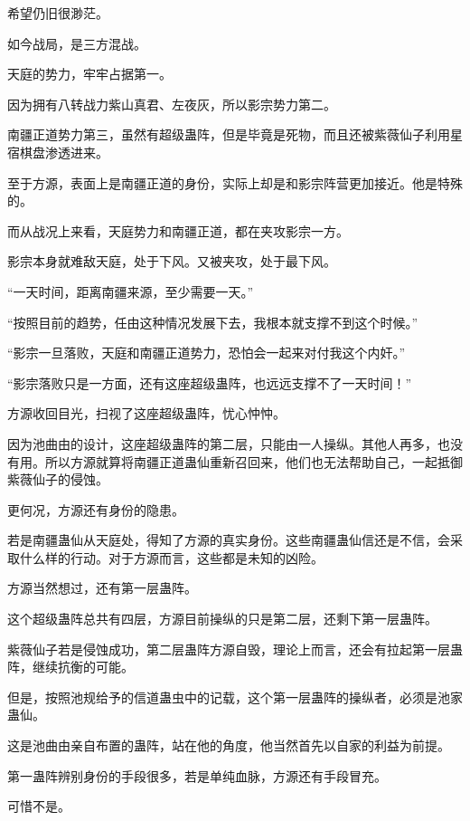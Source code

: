 
\begin{this_body}

希望仍旧很渺茫。

如今战局，是三方混战。

天庭的势力，牢牢占据第一。

因为拥有八转战力紫山真君、左夜灰，所以影宗势力第二。

南疆正道势力第三，虽然有超级蛊阵，但是毕竟是死物，而且还被紫薇仙子利用星宿棋盘渗透进来。

至于方源，表面上是南疆正道的身份，实际上却是和影宗阵营更加接近。他是特殊的。

而从战况上来看，天庭势力和南疆正道，都在夹攻影宗一方。

影宗本身就难敌天庭，处于下风。又被夹攻，处于最下风。

“一天时间，距离南疆来源，至少需要一天。”

“按照目前的趋势，任由这种情况发展下去，我根本就支撑不到这个时候。”

“影宗一旦落败，天庭和南疆正道势力，恐怕会一起来对付我这个内奸。”

“影宗落败只是一方面，还有这座超级蛊阵，也远远支撑不了一天时间！”

方源收回目光，扫视了这座超级蛊阵，忧心忡忡。

因为池曲由的设计，这座超级蛊阵的第二层，只能由一人操纵。其他人再多，也没有用。所以方源就算将南疆正道蛊仙重新召回来，他们也无法帮助自己，一起抵御紫薇仙子的侵蚀。

更何况，方源还有身份的隐患。

若是南疆蛊仙从天庭处，得知了方源的真实身份。这些南疆蛊仙信还是不信，会采取什么样的行动。对于方源而言，这些都是未知的凶险。

方源当然想过，还有第一层蛊阵。

这个超级蛊阵总共有四层，方源目前操纵的只是第二层，还剩下第一层蛊阵。

紫薇仙子若是侵蚀成功，第二层蛊阵方源自毁，理论上而言，还会有拉起第一层蛊阵，继续抗衡的可能。

但是，按照池规给予的信道蛊虫中的记载，这个第一层蛊阵的操纵者，必须是池家蛊仙。

这是池曲由亲自布置的蛊阵，站在他的角度，他当然首先以自家的利益为前提。

第一蛊阵辨别身份的手段很多，若是单纯血脉，方源还有手段冒充。

可惜不是。


\end{this_body}
